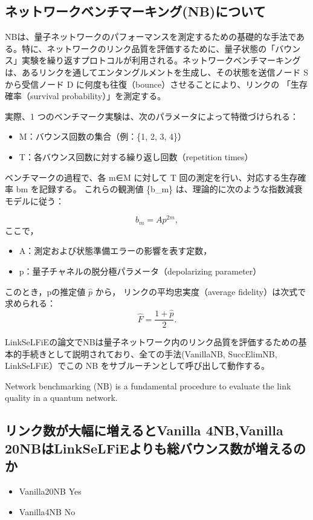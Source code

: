 \documentclass[conference]{IEEEtran}
\begin{document}
\subsection{ネットワークベンチマーキング(NB)について}
\label{sec:orgf4ad935}
NBは、量子ネットワークのパフォーマンスを測定するための基礎的な手法であ
る。特に、ネットワークのリンク品質を評価するために、量子状態の「バウン
ス」実験を繰り返すプロトコルが利用される。ネットワークベンチマーキング
は、あるリンクを通してエンタングルメントを生成し、その状態を送信ノード
S から受信ノード D に何度も往復（bounce）させることにより、リンクの
「生存確率（survival probability）」を測定する。

実際、1 つのベンチマーク実験は、次のパラメータによって特徴づけられる：
\begin{itemize}
\item M：バウンス回数の集合（例：\{1, 2, 3, 4\}）
\item T：各バウンス回数に対する繰り返し回数（repetition times）
\end{itemize}
ベンチマークの過程で、各 m∈M に対して T 回の測定を行い、対応する生存確
率 bm を記録する。
これらの観測値 \{b\_m\} は、理論的に次のような指数減衰モデルに従う：


\[
b_m = A p^{2m},
\]
ここで，

\begin{itemize}
\item A：測定および状態準備エラーの影響を表す定数，
\item p：量子チャネルの脱分極パラメータ（depolarizing parameter）
\end{itemize}


このとき，pの推定値 \(\hat{p}\) から，
リンクの平均忠実度（average fidelity）は次式で求められる：
\[
\hat{F} = \frac{1 + \hat{p}}{2}.
\]

LinkSeLFiEの論文でNBは量子ネットワーク内のリンク品質を評価するための基
本的手続きとして説明されており、全ての手法(VanillaNB, SuccElimNB,
LinkSeLFiE）でこの NB をサブルーチンとして呼び出して動作する。

Network benchmarking (NB) is a fundamental procedure to evaluate the link quality in a quantum network.


\subsection{リンク数が大幅に増えるとVanilla 4NB,Vanilla 20NBはLinkSeLFiEよりも総バウンス数が増えるのか}
\label{sec:orgc515dd5}
\begin{itemize}
\item Vanilla20NB Yes
\item Vanilla4NB No
\end{itemize}
\end{document}
